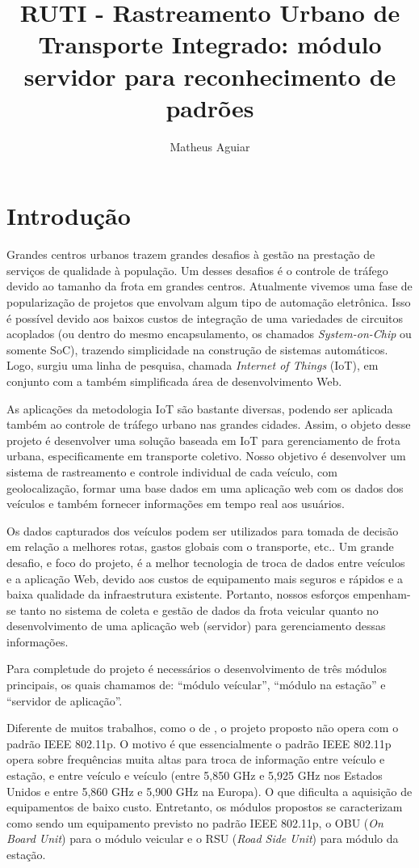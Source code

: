 \documentclass[12pt]{uftpibic}
\title{RUTI - Rastreamento Urbano de Transporte Integrado: módulo servidor para reconhecimento de padrões}
\author{Matheus Aguiar}{Fagundes}
\begin{document}
\maketitle

\chapter{Introdução}

Grandes centros urbanos trazem grandes desafios à gestão na prestação de serviços de qualidade à população. Um desses desafios é o controle de tráfego devido ao tamanho da frota em grandes centros. Atualmente vivemos uma fase de popularização de projetos que envolvam algum tipo de automação eletrônica. Isso é possível devido aos baixos custos de integração de uma variedades de circuitos acoplados (ou dentro do mesmo encapsulamento, os chamados \textit{System-on-Chip} ou somente SoC), trazendo simplicidade na construção de sistemas automáticos. Logo, surgiu uma linha de pesquisa, chamada \textit{Internet of Things} (IoT), em conjunto com a também simplificada área de desenvolvimento Web. 

As aplicações da metodologia IoT são bastante diversas, podendo ser aplicada também ao controle de tráfego urbano nas grandes cidades. Assim, o objeto desse projeto é desenvolver uma solução baseada em IoT para gerenciamento de frota urbana, especificamente em transporte coletivo. Nosso objetivo é desenvolver um sistema de rastreamento e controle individual de cada veículo, com geolocalização, formar uma base dados em uma aplicação web com os dados dos veículos e também fornecer informações em tempo real aos usuários. 

Os dados capturados dos veículos podem ser utilizados para tomada de decisão em relação a melhores rotas, gastos globais com o transporte, etc.. Um grande desafio, e foco do projeto, é a melhor tecnologia de troca de dados entre veículos e a aplicação Web, devido aos custos de equipamento mais seguros e rápidos e a baixa qualidade da infraestrutura existente. Portanto, nossos esforços empenham-se tanto no sistema de coleta e gestão de dados da frota veicular quanto no desenvolvimento de uma aplicação web (servidor) para gerenciamento dessas informações.

Para completude do projeto é necessários o desenvolvimento de três módulos principais, os quais chamamos de: ``módulo veícular'', ``módulo na estação'' e ``servidor de aplicação''.

Diferente de muitos trabalhos, como o de , o projeto proposto não opera com o padrão IEEE 802.11p. O motivo é que essencialmente o padrão IEEE 802.11p opera sobre frequências muita altas para troca de informação entre veículo e estação, e entre veículo e veículo (entre 5,850 GHz e 5,925 GHz nos Estados Unidos e entre 5,860 GHz e 5,900 GHz na Europa). O que dificulta a aquisição de equipamentos de baixo custo. Entretanto, os módulos propostos se caracterizam como sendo um equipamento previsto no padrão IEEE 802.11p, o OBU (\textit{On Board Unit}) para o módulo veicular e o RSU (\textit{Road Side Unit}) para módulo da estação.
\end{document}
